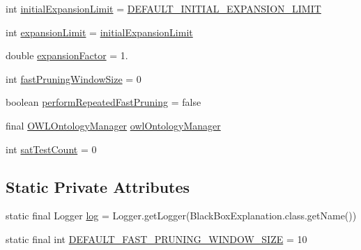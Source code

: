 \begin{DoxyCompactItemize}
\item 
int \hyperlink{classcom_1_1clarkparsia_1_1owlapi_1_1explanation_1_1_black_box_explanation_a9e3f2cb04eafc952cd86fa7911241ac8}{initial\-Expansion\-Limit} = \hyperlink{classcom_1_1clarkparsia_1_1owlapi_1_1explanation_1_1_black_box_explanation_a31eb8b8374e51d80e34ec4231ef531be}{D\-E\-F\-A\-U\-L\-T\-\_\-\-I\-N\-I\-T\-I\-A\-L\-\_\-\-E\-X\-P\-A\-N\-S\-I\-O\-N\-\_\-\-L\-I\-M\-I\-T}
\item 
int \hyperlink{classcom_1_1clarkparsia_1_1owlapi_1_1explanation_1_1_black_box_explanation_aaacbfefd9855ce3489fa8c59b6c77250}{expansion\-Limit} = \hyperlink{classcom_1_1clarkparsia_1_1owlapi_1_1explanation_1_1_black_box_explanation_a9e3f2cb04eafc952cd86fa7911241ac8}{initial\-Expansion\-Limit}
\item 
double \hyperlink{classcom_1_1clarkparsia_1_1owlapi_1_1explanation_1_1_black_box_explanation_a9461893fc6bfa532a3431029025515bc}{expansion\-Factor} = 1.
\item 
int \hyperlink{classcom_1_1clarkparsia_1_1owlapi_1_1explanation_1_1_black_box_explanation_a66e2fee832d754d87e51456e9704020b}{fast\-Pruning\-Window\-Size} = 0
\item 
boolean \hyperlink{classcom_1_1clarkparsia_1_1owlapi_1_1explanation_1_1_black_box_explanation_a68b64f097123e3d846cc0fcefe706f24}{perform\-Repeated\-Fast\-Pruning} = false
\item 
final \hyperlink{interfaceorg_1_1semanticweb_1_1owlapi_1_1model_1_1_o_w_l_ontology_manager}{O\-W\-L\-Ontology\-Manager} \hyperlink{classcom_1_1clarkparsia_1_1owlapi_1_1explanation_1_1_black_box_explanation_a2502b1228134488a621a66e79e3a2a7a}{owl\-Ontology\-Manager}
\item 
int \hyperlink{classcom_1_1clarkparsia_1_1owlapi_1_1explanation_1_1_black_box_explanation_a113c010a09e1cb814cb9db633196bfe8}{sat\-Test\-Count} = 0
\end{DoxyCompactItemize}
\subsection*{Static Private Attributes}
\begin{DoxyCompactItemize}
\item 
static final Logger \hyperlink{classcom_1_1clarkparsia_1_1owlapi_1_1explanation_1_1_black_box_explanation_a9bda0aae8d303db7a0cf594f82079b7a}{log} = Logger.\-get\-Logger(Black\-Box\-Explanation.\-class.\-get\-Name())
\item 
static final int \hyperlink{classcom_1_1clarkparsia_1_1owlapi_1_1explanation_1_1_black_box_explanation_ada162836ddc1b535fb025fd6f74aa16c}{D\-E\-F\-A\-U\-L\-T\-\_\-\-F\-A\-S\-T\-\_\-\-P\-R\-U\-N\-I\-N\-G\-\_\-\-W\-I\-N\-D\-O\-W\-\_\-\-S\-I\-Z\-E} = 10
\end{DoxyCompactItemize}



